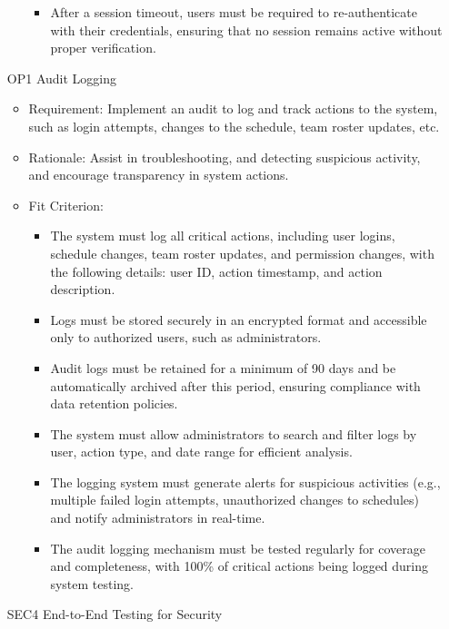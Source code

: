 \documentclass{article}
\begin{document}
\begin{enumerate}
\begin{itemize}
\begin{itemize}
                        \item After a session timeout, users must be required to re-authenticate with their credentials, ensuring that no session remains active without proper verification.
                    \end{itemize}
          \end{itemize}
    \item[OP1] Audit Logging
          \begin{itemize}
              \item Requirement: Implement an audit to log and track actions to the system, such as login attempts, changes to the schedule, team roster updates, etc.
              \item Rationale: Assist in troubleshooting, and detecting suspicious activity, and encourage transparency in system actions.
              \item Fit Criterion:
                    \begin{itemize}
                        \item The system must log all critical actions, including user logins, schedule changes, team roster updates, and permission changes, with the following details: user ID, action timestamp, and action description.
                        \item Logs must be stored securely in an encrypted format and accessible only to authorized users, such as administrators.
                        \item Audit logs must be retained for a minimum of 90 days and be automatically archived after this period, ensuring compliance with data retention policies.
                        \item The system must allow administrators to search and filter logs by user, action type, and date range for efficient analysis.
                        \item The logging system must generate alerts for suspicious activities (e.g., multiple failed login attempts, unauthorized changes to schedules) and notify administrators in real-time.
                        \item The audit logging mechanism must be tested regularly for coverage and completeness, with 100\% of critical actions being logged during system testing.
                    \end{itemize}
          \end{itemize}
    \item[SEC4] End-to-End Testing for Security

\end{enumerate}
\end{document}
